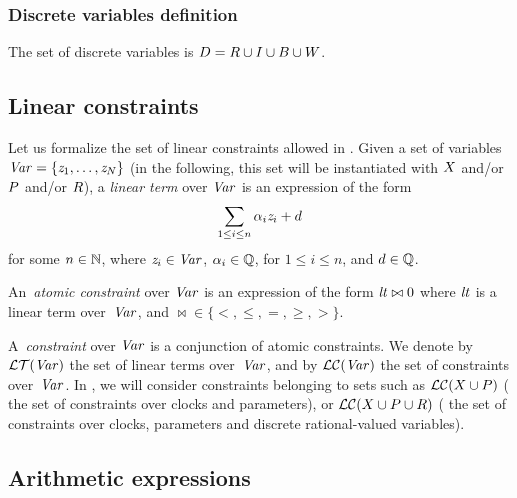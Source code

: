 \subsubsection{Discrete variables definition}

The set of discrete variables is $D = R \cup I \cup B \cup W $.



\subsection{Linear constraints}\label{ss:constraints}

Let us formalize the set of linear constraints allowed in \imitator{}.
Given a set of variables~$\mathit{Var} = \{ \mathit{z}_1, \dots, \mathit{z}_N \}$ (in the following, this set will be instantiated with $X$ and/or $P$ and/or $R$), a \emph{linear term} over $\mathit{Var}$ is an expression of the form
$$
	\sum_{1 \leq i \leq n} \alpha_i \mathit{z}_i + d
$$
for some $n \in \mathbb N$,
where
$\mathit{z}_{i} \in \mathit{Var}$,
$\alpha_{i} \in \mathbb Q$, for $1 \leq i \leq n$,
and
$d \in \mathbb Q$.

An~\emph{atomic constraint} over $\mathit{Var}$ is an expression of the form
$
	\mathit{lt} \bowtie 0
$
where
$\mathit{lt}$ is a linear term over~$\mathit{Var}$,
and
${\bowtie} \in \{ <, \leq, =, \geq, > \}$.

A~\emph{constraint} over $\mathit{Var}$ is a conjunction of atomic constraints.
We denote by $\mathcal{LT}(\mathit{Var})$ the set of linear terms over~$\mathit{Var}$, and by $\mathcal{LC}(\mathit{Var})$ the set of constraints over~$\mathit{Var}$.
In \imitator{}, we will consider constraints belonging to sets such as $\mathcal{LC}(X \cup P)$ (\ie{} the set of constraints over clocks and parameters), or $\mathcal{LC}(X \cup P \cup R)$ (\ie{} the set of constraints over clocks, parameters and discrete rational-valued variables).



\subsection{Arithmetic expressions}

